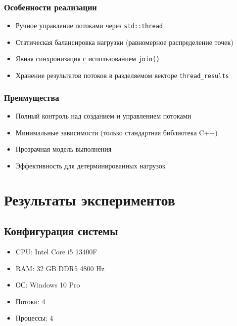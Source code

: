 \documentclass[12pt]{article}
\begin{document}
\subsubsection*{Особенности реализации}
\begin{itemize}
  \item Ручное управление потоками через \texttt{std::thread}
  \item Статическая балансировка нагрузки (равномерное распределение точек)
  \item Явная синхронизация с использованием \texttt{join()}
  \item Хранение результатов потоков в разделяемом векторе \texttt{thread\_results}
\end{itemize}

\subsubsection*{Преимущества}
\begin{itemize}
  \item Полный контроль над созданием и управлением потоками
  \item Минимальные зависимости (только стандартная библиотека C++)
  \item Прозрачная модель выполнения
  \item Эффективность для детерминированных нагрузок
\end{itemize}

\section{Результаты экспериментов}
\subsection*{Конфигурация системы}
\begin{itemize}
  \item CPU: Intel Core i5 13400F
  \item RAM: 32 GB DDR5 4800 Hz
  \item ОС: Windows 10 Pro
  \item Потоки: 4
  \item Процессы: 4
\end{itemize}
\end{document}
